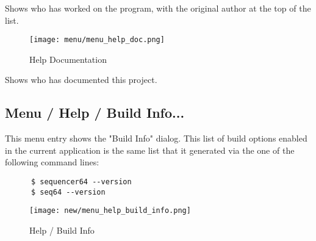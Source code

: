    Shows who has worked on the program, with the original author at the top
   of the list.

\begin{figure}[H]
   \centering 
   \texttt{[image: menu/menu\_help\_doc.png]}
   \caption{Help Documentation}
   \label{fig:seq64_menu_help_doc}
\end{figure}

   Shows who has documented this project.

\subsection{Menu / Help / Build Info...}
\label{subsec:seq64_menu_build_info}

   This menu entry shows the "Build Info" dialog.  This list of
   build options enabled in the current application is the same list
   that it generated via the one of the following command lines:

   \begin{verbatim}
      $ sequencer64 --version
      $ seq64 --version
   \end{verbatim}

\begin{figure}[H]
   \centering 
   \texttt{[image: new/menu\_help\_build\_info.png]}
   \caption{Help / Build Info}
   \label{fig:seq64_menu_help_build_info}
\end{figure}

